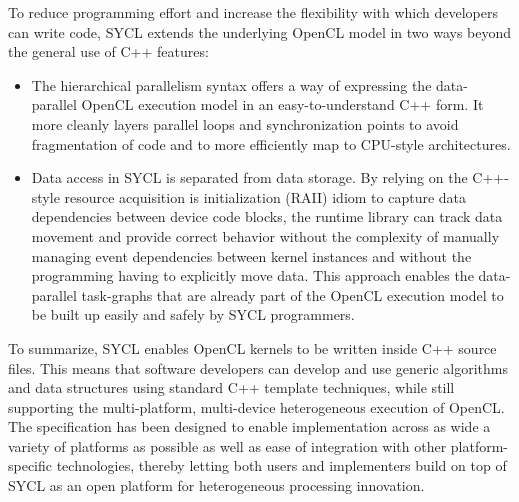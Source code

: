 To reduce programming effort and increase the flexibility with which developers
can write code, SYCL extends the underlying OpenCL model in two ways beyond the
general use of C++ features:
\begin{itemize}
  \item
    The hierarchical parallelism syntax offers a way of expressing the
    data-parallel OpenCL execution model in an easy-to-understand C++ form.
    It more cleanly layers parallel loops and synchronization points to avoid
    fragmentation of code and to more efficiently map to CPU-style
    architectures.
  \item
    Data access in SYCL is separated from data storage. By relying on the
    C++-style resource acquisition is initialization (RAII) idiom to capture
    data dependencies between device code blocks, the runtime library can track
    data movement and provide correct behavior without the complexity of
    manually managing event dependencies between kernel instances and without
    the programming having to explicitly move data. This approach enables the
    data-parallel task-graphs that are already part of the OpenCL execution
    model to be built up easily and safely by SYCL programmers.
\end{itemize}

To summarize, SYCL enables OpenCL kernels to be written inside C++
source files. This means that software developers can develop and use generic
algorithms and data structures using standard C++ template techniques, while
still supporting the multi-platform, multi-device heterogeneous execution of
OpenCL. The specification has been designed to enable implementation across as
wide a variety of platforms as possible as well as ease of integration with
other platform-specific technologies, thereby letting both users and
implementers build on top of SYCL as an open platform for heterogeneous
processing innovation.


